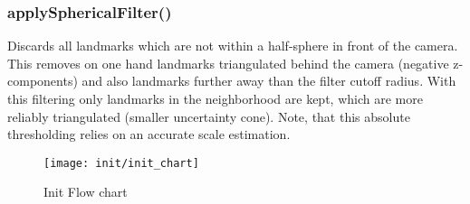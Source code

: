 \subsubsection{applySphericalFilter()}
\label{sub_sec_sphFilter}
Discards all landmarks which are not within a half-sphere in front of the camera. This removes on one hand landmarks triangulated behind the camera (negative z-components) and also landmarks further away than the filter cutoff radius. With this filtering only landmarks in the neighborhood are kept, which are more reliably triangulated (smaller uncertainty cone). Note, that this absolute thresholding relies on an accurate scale estimation.

\begin{figure}[ht]
	\centering
	\texttt{[image: init/init\_chart]}
	\caption{Init Flow chart}
	\label{img_flow_init}
\end{figure}